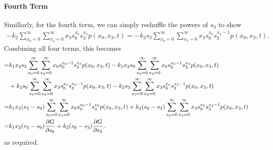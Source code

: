 \documentclass[11pt,a4paper]{article}
\begin{document}
\paragraph{Fourth Term}
Simillarly, for the fourth term, we can simply reshuffle the powers of $s_3$ to show 
\begin{align*}
- k_2 \sum_{x_0 = 0}^\infty \sum_{x_3 = 0}^\infty x_3 s_0^{x_0} s_3^{x_3} p(x_0,x_3,t) = 
-k_2 s_3 \sum_{x_0 = 0}^\infty \sum_{x_3 = 0}^\infty x_3 s_0^{x_0} s_3^{x_3-1}  p(x_0,x_3,t).
\end{align*}
Combining all four terms, this becomes 
\begin{align*}
=& k_1 x_2 s_3 \sum_{x_0=0}^{\infty} \sum_{x_3=0}^{\infty} x_0 s_0^{x_0-1} s_3^{x_3}  p(x_0,x_3,t) -k_1 x_2 s_0 \sum_{x_0 = 0}^\infty \sum_{x_3 = 0}^\infty x_0 s_0^{x_0-1} s_3^{x_3}  p(x_0,x_3,t)  \\
& + k_2 s_0 \sum_{x_0 = 0}^\infty \sum_{x_3=0}^\infty x_3 s_0^{x_0} s_3^{x_3-1} p(x_0,x_3,t)
-k_2 s_3 \sum_{x_0 = 0}^\infty \sum_{x_3 = 0}^\infty x_3 s_0^{x_0} s_3^{x_3-1}  p(x_0,x_3,t)
\\
=& k_1 x_2 (s_3 -s_0) \sum_{x_0 = 0}^\infty \sum_{x_3 = 0}^\infty x_0 s_0^{x_0-1} s_3^{x_3} p(x_0,x_3,t) + k_2 (s_0 -s_3) \sum_{x_0 = 0}^\infty \sum_{x_3 = 0}^\infty x_3 s_0^{x_0} s_3^{x_3-1}  p(x_0,x_3,t) \\
=& k_1 x_2 (s_3 - s_0) \pdv{G}{s_0} + k_2 (s_0 - s_3) \pdv{G}{s_3}, 
\end{align*}
as required.
\end{document}

